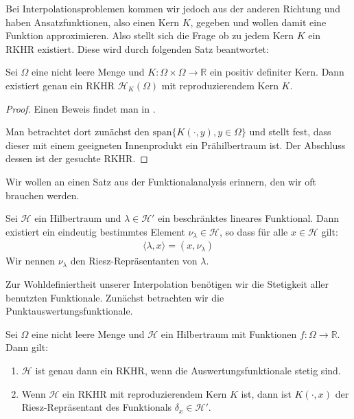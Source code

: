 Bei Interpolationsproblemen kommen wir jedoch aus der anderen Richtung und haben Ansatzfunktionen, also einen Kern $K$, gegeben und wollen damit eine Funktion approximieren. Also stellt sich die Frage ob zu jedem Kern $K$ ein \ac{RKHR} existiert. Diese wird durch folgenden Satz beantwortet:

\begin{theorem}
Sei $\Omega$ eine nicht leere Menge und $K:\Omega \times \Omega \rightarrow \mathbb{R}$ ein positiv definiter Kern. Dann existiert genau ein \ac{RKHR} $\mathcal{H}_K (\Omega)$ mit reproduzierendem Kern $K$.
\end{theorem}
\begin{proof}
Einen Beweis findet man in \textcite[Kap. 10.2]{Wendland.2005}. 

Man betrachtet dort zunächst den $\text{span} \{K(\cdot,y), y \in \Omega \}$ und stellt fest, dass dieser mit einem geeigneten Innenprodukt ein Prähilbertraum ist. Der Abschluss dessen ist der gesuchte \ac{RKHR}.
\end{proof}

Wir wollen an einen Satz aus der Funktionalanalysis erinnern, den wir oft brauchen werden.

\begin{theorem}
Sei $\mathcal{H}$ ein Hilbertraum und $\lambda \in \mathcal{H}'$ ein beschränktes lineares Funktional. Dann existiert ein eindeutig bestimmtes Element $\nu_\lambda \in \mathcal{H}$, so dass für alle $x \in \mathcal{H}$ gilt:
\begin{align*}
\langle \lambda, x \rangle = \left( x, \nu_\lambda \right)
\end{align*}
Wir nennen $\nu_\lambda$ den Riesz-Repräsentanten von $\lambda$.
\end{theorem}

Zur Wohldefiniertheit unserer Interpolation benötigen wir die Stetigkeit aller benutzten Funktionale. Zunächst betrachten wir die Punktauswertungsfunktionale.

\begin{theorem}
\label{stetig}
Sei $\Omega$ eine nicht leere Menge und $\mathcal{H}$ ein Hilbertraum mit Funktionen $f: \Omega \rightarrow \mathbb{R}$. Dann gilt:
\begin{enumerate}
\item \label{stetig1} $\mathcal{H}$ ist genau dann ein \ac{RKHR}, wenn die Auswertungsfunktionale stetig sind.
\item \label{stetig2} Wenn $\mathcal{H}$ ein \ac{RKHR} mit reproduzierendem Kern $K$ ist, dann ist $K(\cdot,x)$ der Riesz-Repräsentant des Funktionals $\delta_x \in \mathcal{H}'$.
\end{enumerate}
\end{theorem}

